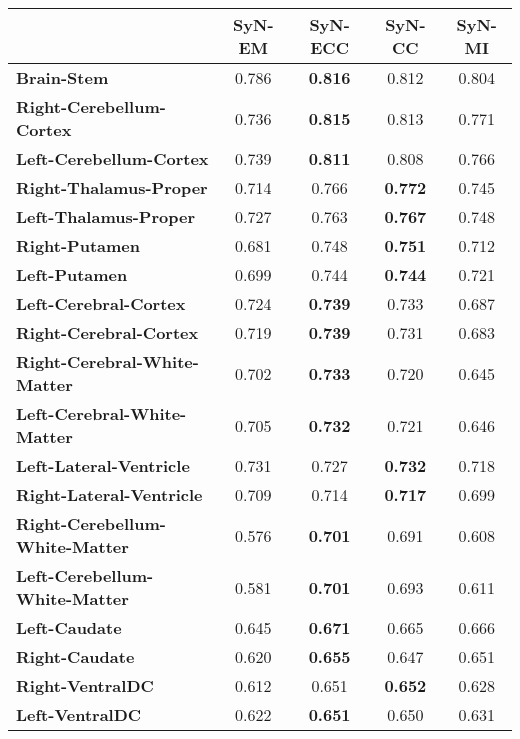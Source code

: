 \begin{table}[p]
  {\centering
    \small
    \begin{tabular}{lcccc}
    \toprule
    \textbf{}& \textbf{SyN-EM} & \textbf{SyN-ECC} & \textbf{SyN-CC} & \textbf{SyN-MI} \\
    \midrule
    \textbf{Brain-Stem} & 0.786 & \textbf{0.816} & 0.812 & 0.804 \\
    \textbf{Right-Cerebellum-Cortex} & 0.736 & \textbf{0.815} & 0.813 & 0.771 \\
    \textbf{Left-Cerebellum-Cortex} & 0.739 & \textbf{0.811} & 0.808 & 0.766 \\
    \textbf{Right-Thalamus-Proper} & 0.714 & 0.766 & \textbf{0.772} & 0.745 \\
    \textbf{Left-Thalamus-Proper} & 0.727 & 0.763 & \textbf{0.767} & 0.748 \\
    \textbf{Right-Putamen} & 0.681 & 0.748 & \textbf{0.751} & 0.712 \\
    \textbf{Left-Putamen} & 0.699 & 0.744 & \textbf{0.744} & 0.721 \\
    \textbf{Left-Cerebral-Cortex} & 0.724 & \textbf{0.739} & 0.733 & 0.687 \\
    \textbf{Right-Cerebral-Cortex} & 0.719 & \textbf{0.739} & 0.731 & 0.683 \\
    \textbf{Right-Cerebral-White-Matter} & 0.702 & \textbf{0.733} & 0.720 & 0.645 \\
    \textbf{Left-Cerebral-White-Matter} & 0.705 & \textbf{0.732} & 0.721 & 0.646 \\
    \textbf{Left-Lateral-Ventricle} & 0.731 & 0.727 & \textbf{0.732} & 0.718 \\
    \textbf{Right-Lateral-Ventricle} & 0.709 & 0.714 & \textbf{0.717} & 0.699 \\
    \textbf{Right-Cerebellum-White-Matter} & 0.576 & \textbf{0.701} & 0.691 & 0.608 \\
    \textbf{Left-Cerebellum-White-Matter} & 0.581 & \textbf{0.701} & 0.693 & 0.611 \\
    \textbf{Left-Caudate} & 0.645 & \textbf{0.671} & 0.665 & 0.666 \\
    \textbf{Right-Caudate} & 0.620 & \textbf{0.655} & 0.647 & 0.651 \\
    \textbf{Right-VentralDC} & 0.612 & 0.651 & \textbf{0.652} & 0.628 \\
    \textbf{Left-VentralDC} & 0.622 & \textbf{0.651} & 0.650 & 0.631 \\

\end{tabular}}
\end{table}
